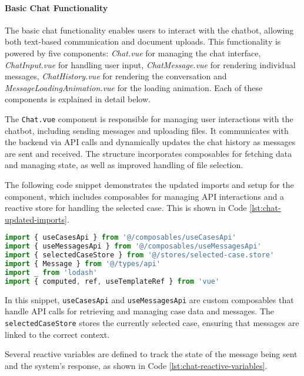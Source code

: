 \paragraph{Basic Chat Functionality}%

The basic chat functionality enables users to interact with the chatbot, allowing both text-based communication and
document uploads. This functionality is powered by five components: \textit{Chat.vue}
for managing the chat interface, \textit{ChatInput.vue} for handling user input, \textit{ChatMessage.vue} for rendering
individual messages, \textit{ChatHistory.vue} for rendering the conversation and \textit{MessageLoadingAnimation.vue}
for the loading animation. Each of these components is explained in detail below.

The \texttt{Chat.vue}
component is responsible for managing user interactions with the chatbot, including sending messages and uploading
files. It communicates with the backend via API calls and dynamically updates the chat history as messages are sent and
received. The structure incorporates composables for fetching data and managing state, as well as improved handling of
file selection.

The following code snippet demonstrates the updated imports and setup for the component, which includes composables for
managing API interactions and a reactive store for handling the selected case. This is shown in
Code \ref{lst:chat-updated-imports}.

\begin{lstlisting}[language=JavaScript, caption={Updated Imports and Setup (\texttt{Chat.vue})},
  firstnumber=2,label={lst:chat-updated-imports}]
import { useCasesApi } from '@/composables/useCasesApi'
import { useMessagesApi } from '@/composables/useMessagesApi'
import { selectedCaseStore } from '@/stores/selected-case.store'
import { Message } from '@/types/api'
import _ from 'lodash'
import { computed, ref, useTemplateRef } from 'vue'
\end{lstlisting}

In this snippet, \texttt{useCasesApi} and \texttt{useMessagesApi} are custom composables that
handle API calls for retrieving and managing case data and
messages. The \texttt{selectedCaseStore} stores the currently selected
case, ensuring that messages are linked to the correct context.

Several reactive variables are defined to track the state of the message being sent and the system’s response, as shown
in Code \ref{lst:chat-reactive-variables}.

